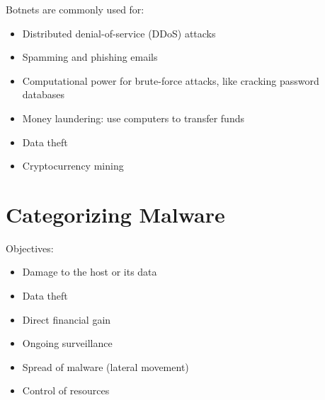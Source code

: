 Botnets are commonly used for:
\begin{itemize}
    \item Distributed denial-of-service (DDoS) attacks
    \item Spamming and phishing emails
    \item Computational power for brute-force attacks, like cracking password databases
    \item Money laundering: use computers to transfer funds
    \item Data theft
    \item Cryptocurrency mining
\end{itemize}

\section{Categorizing Malware}
Objectives:
\begin{itemize}
    \item Damage to the host or its data
    \item Data theft
    \item Direct financial gain
    \item Ongoing surveillance
    \item Spread of malware (lateral movement)
    \item Control of resources
\end{itemize}
